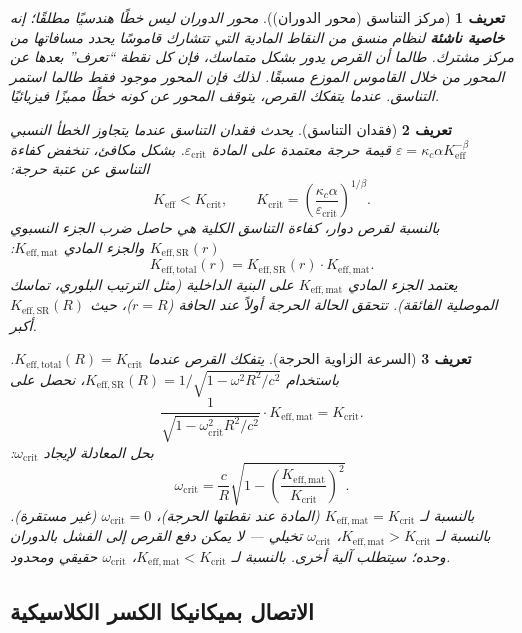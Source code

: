 \documentclass[12pt,a4paper]{article}
\newtheorem{definition}{تعريف}[section]
\newcommand{\kappac}{\kappa_c}
\newcommand{\betaf}{\beta}
\newcommand{\Keff}{K_{\mathrm{eff}}}
\newcommand{\Keffmat}{K_{\mathrm{eff,mat}}}
\newcommand{\Kefftot}{K_{\mathrm{eff,total}}}
\newcommand{\KeffSR}{K_{\mathrm{eff,SR}}}
\newcommand{\Kcrit}{K_{\mathrm{crit}}}
\begin{document}
	\begin{definition}[مركز التناسق (محور الدوران)]
		محور الدوران ليس خطًا هندسيًا مطلقًا؛ إنه \textbf{خاصية ناشئة} لنظام منسق من النقاط المادية التي تتشارك قاموسًا يحدد مسافاتها من مركز مشترك. طالما أن القرص يدور بشكل متماسك، فإن كل نقطة ``تعرف'' بعدها عن المحور من خلال القاموس الموزع مسبقًا. لذلك فإن المحور موجود فقط طالما استمر التناسق. عندما يتفكك القرص، يتوقف المحور عن كونه خطًا مميزًا فيزيائيًا.
	\end{definition}
	
	\begin{definition}[فقدان التناسق]
		يحدث فقدان التناسق عندما يتجاوز الخطأ النسبي \(\varepsilon = \kappac \alpha K_{\mathrm{eff}}^{-\betaf}\) قيمة حرجة معتمدة على المادة \(\varepsilon_{\text{crit}}\). بشكل مكافئ، تنخفض كفاءة التناسق عن عتبة حرجة:
		\[
		\Keff < \Kcrit, \qquad \Kcrit = \left( \frac{\kappac \alpha}{\varepsilon_{\text{crit}}} \right)^{1/\betaf}.
		\]
		بالنسبة لقرص دوار، كفاءة التناسق الكلية هي حاصل ضرب الجزء النسبوي \(K_{\mathrm{eff,SR}}(r)\) والجزء المادي \(K_{\mathrm{eff,mat}}\):
		\[
		\Kefftot(r) = \KeffSR(r) \cdot \Keffmat.
		\]
		يعتمد الجزء المادي \(K_{\mathrm{eff,mat}}\) على البنية الداخلية (مثل الترتيب البلوري، تماسك الموصلية الفائقة). تتحقق الحالة الحرجة أولاً عند الحافة (\(r = R\))، حيث \(\KeffSR(R)\) أكبر.
	\end{definition}
	
	\begin{definition}[السرعة الزاوية الحرجة]
		يتفكك القرص عندما \(\Kefftot(R) = \Kcrit\). باستخدام \(\KeffSR(R) = 1/\sqrt{1 - \omega^2 R^2/c^2}\)، نحصل على
		\[
		\frac{1}{\sqrt{1 - \omega_{\text{crit}}^2 R^2/c^2}} \cdot \Keffmat = \Kcrit.
		\]
		بحل المعادلة لإيجاد \(\omega_{\text{crit}}\):
		\[
		\boxed{\omega_{\text{crit}} = \frac{c}{R} \sqrt{1 - \left( \frac{\Keffmat}{\Kcrit} \right)^2 }}.
		\]
		بالنسبة لـ \(\Keffmat = \Kcrit\) (المادة عند نقطتها الحرجة)، \(\omega_{\text{crit}} = 0\) (غير مستقرة). بالنسبة لـ \(\Keffmat > \Kcrit\)، \(\omega_{\text{crit}}\) تخيلي — لا يمكن دفع القرص إلى الفشل بالدوران وحده؛ سيتطلب آلية أخرى. بالنسبة لـ \(\Keffmat < \Kcrit\)، \(\omega_{\text{crit}}\) حقيقي ومحدود.
	\end{definition}
	
	\subsection{الاتصال بميكانيكا الكسر الكلاسيكية}
	
\end{document}
